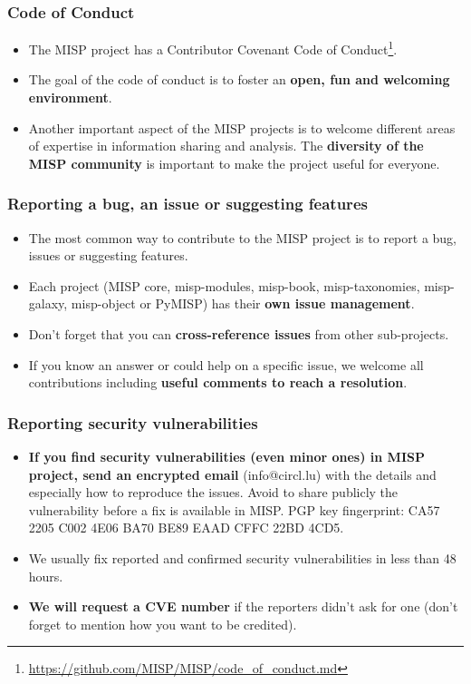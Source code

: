 
\begin{frame}[t,plain]
\titlepage
\end{frame}

\begin{frame}[fragile]
\frametitle{Code of Conduct}
\begin{itemize}
\item The MISP project has a Contributor Covenant Code of Conduct\footnote{\url{https://github.com/MISP/MISP/code_of_conduct.md}}.
\item The goal of the code of conduct is to foster an {\bf open, fun and welcoming environment}.
\item Another important aspect of the MISP projects is to welcome different areas of expertise in information sharing and analysis. The {\bf diversity of the MISP community} is important to make the project useful for everyone.
\end{itemize}
\end{frame}

\begin{frame}[fragile]
\frametitle{Reporting a bug, an issue or suggesting features}
\begin{itemize}
\item The most common way to contribute to the MISP project is to report a bug, issues or suggesting features.
\item Each project (MISP core, misp-modules, misp-book, misp-taxonomies, misp-galaxy, misp-object or PyMISP) has their {\bf own issue management}.
\item Don't forget that you can {\bf cross-reference issues} from other sub-projects.
\item If you know an answer or could help on a specific issue, we welcome all contributions including {\bf useful comments to reach a resolution}.
\end{itemize}
\end{frame}

\begin{frame}[fragile]
\frametitle{Reporting security vulnerabilities}
\begin{itemize}
\item {\bf If you find security vulnerabilities (even minor ones) in MISP project, send an encrypted email} (info@circl.lu) with the details and especially how to reproduce the issues. Avoid to share publicly the vulnerability before a fix is available in MISP. PGP key fingerprint: CA57 2205 C002 4E06 BA70 BE89 EAAD CFFC 22BD 4CD5.
\item We usually fix reported and confirmed security vulnerabilities in less than 48 hours.
\item {\bf We will request a CVE number} if the reporters didn't ask for one (don't forget to mention how you want to be credited).
\end{itemize}
\end{frame}


